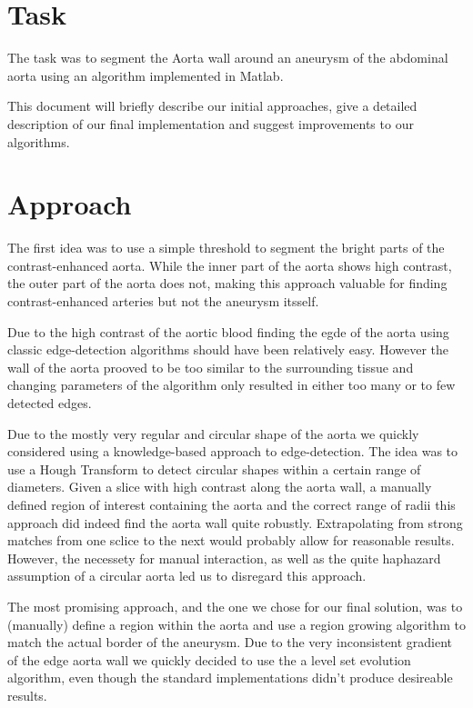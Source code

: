 \documentclass[a4paper]{scrartcl}
\begin{document}


\section*{Task}

The task was to segment the Aorta wall around an aneurysm of the abdominal
aorta using an algorithm implemented in Matlab. 

This document will briefly describe our initial approaches, give a detailed
description of our final implementation and suggest improvements to our
algorithms.

\section*{Approach}

The first idea was to use a simple threshold to segment the bright parts of the
contrast-enhanced aorta. While the inner part of the aorta shows high contrast,
the outer part of the aorta does not, making this approach valuable for finding
contrast-enhanced arteries but not the aneurysm itsself.

Due to the high contrast of the aortic blood finding the egde of the aorta
using classic edge-detection algorithms should have been relatively easy. 
However the wall of the aorta prooved to be too similar to the surrounding 
tissue and changing parameters of the algorithm only resulted in either too
many or to few detected edges.

Due to the mostly very regular and circular shape of the aorta we quickly 
considered using a knowledge-based approach to edge-detection. The idea was to
use a Hough Transform to detect circular shapes within a certain range of
diameters. Given a slice with high contrast along the aorta wall, a manually
defined region of interest containing the aorta and the correct range of radii
this approach did indeed find the aorta wall quite robustly. Extrapolating from
strong matches from one sclice to the next would probably allow for reasonable
results. However, the necessety for manual interaction, as well as the quite
haphazard assumption of a circular aorta led us to disregard this approach.

The most promising approach, and the one we chose for our final solution, was
to (manually) define a region within the aorta and use a region growing
algorithm to match the actual border of the aneurysm. Due to the very
inconsistent gradient of the edge aorta wall we quickly decided to use the a
level set evolution algorithm, even though the standard implementations didn't
produce desireable results. 
\end{document}

